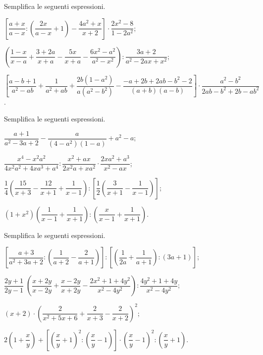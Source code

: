 \begin{esercizio}[\Ast]
Semplifica le seguenti espressioni.
\begin{enumeratea}
 \item $\left[\dfrac{a+x}{a-x}:\left(\dfrac{2x}{a-x}+1\right)-\dfrac{4a^{2}+x}{x+2}\right]\cdot {\dfrac{2x^{2}-8}{1-2a^{2}}}$;
 \item $\left(\dfrac{1-x}{x-a}+\dfrac{3+2a}{x+a}-\dfrac{5x}{x+a}-\dfrac{6x^{2}-a^{2}}{a^{2}-x^{2}}\right):\dfrac{3a+2}{a^{2}-2ax+x^{2}}$;
 \item $\left[\dfrac{a-b+1}{a^{2}-ab}+\dfrac{1}{a^{2}+ab}+\dfrac{2b\left(1-a^{2}\right)}{a\left(a^{2}-b^{2}\right)}-\dfrac{-a+2b+2ab-b^2-2}{(a+b)(a-b)}\right]\cdot {\dfrac{a^{2}-b^{2}}{2ab-b^{2}+2b-ab^{2}}}$.
\end{enumeratea}
\end{esercizio}

\begin{esercizio}
Semplifica le seguenti espressioni.
\begin{enumeratea}
 \item $\dfrac{a+1}{a^{2}-3a+2}-\dfrac{a}{(4-a^{2})(1-a)}+a^{2}-a$;
 \item $\dfrac{x^{4}-x^{2}a^{2}}{4x^{2}a^{2}+4xa^{3}+a^{4}}:\dfrac{x^{2}+ax}{2x^{2}a+xa^{2}}\cdot {\dfrac{2xa^{2}+a^{3}}{x^{2}-ax}}$;
 \item $\dfrac{1}{4}\left(\dfrac{15}{x+3}-\dfrac{12}{x+1}+\dfrac{1}{x-1}\right):\left[\dfrac{1}{2}\left(\dfrac{3}{x+1}-\dfrac{1}{x-1}\right)\right]$;
 \item $\left(1+x^{2}\right)\left(\dfrac{1}{x-1}+\dfrac{1}{x+1}\right):\left(\dfrac{x}{x-1}+\dfrac{1}{x+1}\right)$.
\end{enumeratea}
\end{esercizio}

\begin{esercizio}
Semplifica le seguenti espressioni.
\begin{enumeratea}
 \item $\left[\dfrac{a+3}{a^{2}+3a+2}:\left(\dfrac{1}{a+2}-\dfrac{2}{a+1}\right)\right]:\left[\left(\dfrac{1}{2a}+\dfrac{1}{a+1}\right):(3a+1)\right]$;
 \item $\dfrac{2y+1}{2y-1}\;\left(\dfrac{x+2y}{x-2y}+\dfrac{x-2y}{x+2y}-\dfrac{2x^{2}+1+4y^{2}}{x^{2}-4y^{2}}\right):\dfrac{4y^{2}+1+4y}{x^{2}-4y^{2}}$;
 \item $(x+2)\cdot \left(\dfrac{2}{x^{2}+5x+6}+\dfrac{2}{x+3}-\dfrac{2}{x+2}\right)^{2}$;
 \item $2\left(1+\dfrac{x}{y}\right)+\left[\left(\dfrac{x}{y}+1\right)^{2}:\left(\dfrac{x}{y}-1\right)\right]\cdot \left(\dfrac{x}{y}-1\right)^{2}:\left(\dfrac{x}{y}+1\right)$.
\end{enumeratea}
\end{esercizio}

